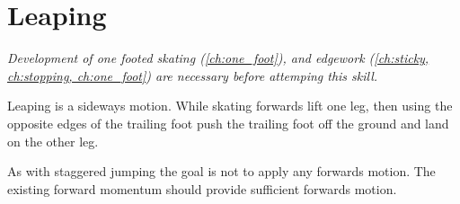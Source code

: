 \section{Leaping}
\label{sec:jumping/leaping}

{\it Development of one footed skating (\cref{ch:one_foot}), and edgework (\cref{ch:sticky, ch:stopping, ch:one_foot}) are necessary before attemping this skill.}     

Leaping is a sideways motion.
While skating forwards lift one leg, then using the opposite edges of the trailing foot push the trailing foot off the ground and land on the other leg.   


As with staggered jumping the goal is not to apply any forwards motion.
The existing forward momentum should provide sufficient forwards motion. 
